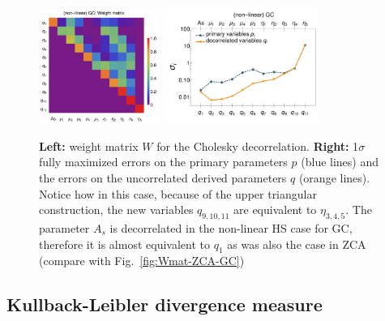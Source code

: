 \begin{figure}[htbp]
	\includegraphics[width=0.35\textwidth]{Chapters/linear-nonlinear-MG-forecasts/figures/Decorrelations-GC/Weight_Matrix_Cholesky_SquareNorm--_fiducialMGBin3_Euclid_GC_nonlinearPk__Zhao_.pdf}
	\includegraphics[width=0.45\textwidth]{Chapters/linear-nonlinear-MG-forecasts/figures/Decorrelations-GC/Errors_at_par_index_i--_Cholesky_SquareNorm--fiducialMGBin3_Euclid_GC_nonlinearPk__Zhao_.pdf}
	\caption[Cholesky decorrelation: Weight matrix and uncorrelated errors.]{\textbf{Left:} weight matrix $W$ for the Cholesky decorrelation. \textbf{Right:} 1$\sigma$ fully maximized errors on
		the primary parameters $p$ (blue lines) and the errors on the uncorrelated
		derived parameters $q$ (orange lines). Notice how in this case, because of the upper triangular construction, the new variables
		$q_{9,10,11}$ are equivalent to $\eta_{3,4,5}$. The parameter $A_s$ is decorrelated in the non-linear HS case for GC, therefore
		it is almost equivalent to $q_1$ as was also the case in ZCA (compare with Fig.\ \ref{fig:Wmat-ZCA-GC})
	}\label{fig:Chol-GCnlhs}
\end{figure}


\subsection{Kullback-Leibler divergence measure \label{sub:KL-matrices-MGBin}}

